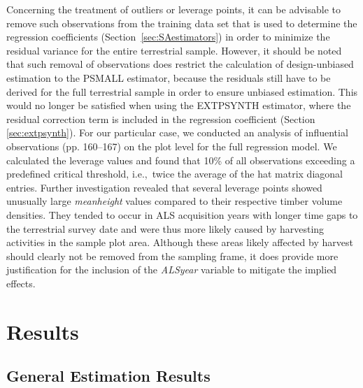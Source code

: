 \documentclass[remotesensing,article,accept,moreauthors,pdftex,10pt,a4paper]{Definitions/mdpi}
\newcommand{\psmall}{PSMALL}
\newcommand{\extpsynth}{EXTPSYNTH}
\newcommand{\meanheight}{\textit{meanheight}}
\newcommand{\alsyear}{\textit{ALSyear}}
\begin{document}
\vspace{-12pt}
Concerning the treatment of outliers or leverage points, it can be advisable to remove such observations from the training data set that is used to determine the regression coefficients (Section~\ref{sec:SAestimators}) in order to minimize the residual variance for the entire terrestrial sample. However, it should be noted that such removal of observations does restrict the calculation of design-unbiased estimation to the \psmall{} estimator, because the residuals still have to be derived for the full terrestrial sample in order to ensure unbiased estimation. This would no longer be satisfied when using the \extpsynth{} estimator, where the residual correction term is included in the regression coefficient (Section \ref{sec:extpsynth}). For our particular case, we conducted an analysis of influential observations \citep{fahrmeir2013} (pp. 160--167) on the plot level for the full regression model. We calculated the leverage values and found that 10\% of all observations exceeding a predefined critical threshold, i.e.,~twice the average of the hat matrix diagonal entries. Further investigation revealed that several leverage points showed unusually large \meanheight{} values compared to their respective timber volume densities. They tended to occur in ALS acquisition years with longer time gaps to the terrestrial survey date and were thus more likely caused by harvesting activities in the sample plot area.  Although these areas likely affected by harvest should clearly not be removed from the sampling frame, it does provide more justification for the inclusion of the \alsyear{} variable to mitigate the implied effects.



\section{Results}
\label{sec:Res}

\vspace{-6pt}
\subsection{General Estimation Results}
\label{sec:feasest}
\end{document}
